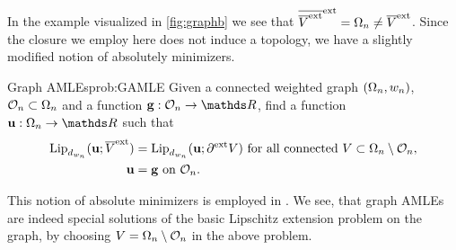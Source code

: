 %
\noindent%
In the example visualized in \cref{fig:graphb} we see that $\overline{\overline{V}^{\text{ext}}}^{\text{ext}}=\Omega_n\neq \overline{V}^{\text{ext}}$. Since the closure we employ here does not induce a topology, we have a slightly modified notion of absolutely minimizers.
%
\begin{problem}{Graph AMLEs}{prob:GAMLE}
Given a connected weighted graph $(\Omega_n, w_n)$, $\mathcal{O}_n\subset\Omega_n$ and a function $\vec g:\conset_n\to\R$, find a function $\vec u:\domain_n\to\R$ such that
%
\begin{align*}
\operatorname{Lip}_{d_{w_n}}(\mathbf{u}; \overline{V}^{\text{ext}}) &= \operatorname{Lip}_{d_{w_n}}(\mathbf{u}; \partial^{\text{ext}} V)
\text{ for all connected } V\subset \Omega_n\setminus\mathcal{O}_n,\\
\mathbf{u} &= \mathbf{g}\text{ on } \mathcal{O}_n.
\end{align*}
\end{problem}
%
\noindent%
This notion of absolute minimizers is employed in \cite{bungert2021uniform, bungert2022ratio}.  We see, that graph AMLEs are indeed special solutions of the basic Lipschitz extension problem on the graph, by choosing $V=\Omega_n\setminus\mathcal{O}_n$ in the above problem.
%
%
%
